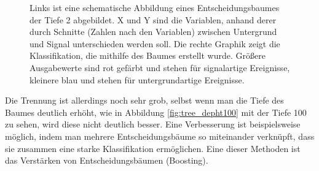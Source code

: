 \begin{figure}[tbp]
\centering     %
{}
\caption{Links ist eine schematische Abbildung eines Entscheidungsbaumes der Tiefe 2 abgebildet. X und Y sind die Variablen, anhand derer durch Schnitte (Zahlen nach den Variablen) zwischen Untergrund und Signal unterschieden werden soll. Die rechte Graphik zeigt die Klassifikation, die mithilfe des Baumes erstellt wurde. Gr\"o\ss ere Ausgabewerte sind rot gef\"arbt und stehen f\"ur signalartige Ereignisse, kleinere blau und stehen f\"ur untergrundartige Ereignisse.}
\end{figure}

Die Trennung ist allerdings noch sehr grob, selbst wenn man die Tiefe des Baumes deutlich erh\"oht, wie in Abbildung \ref{fig:tree_depht100} mit der Tiefe 100 zu sehen, wird diese nicht deutlich besser. Eine Verbesserung ist beispielsweise m\"oglich, indem man mehrere Entscheidungsb\"aume so miteinander verkn\"upft, dass sie zusammen eine starke Klassifikation erm\"oglichen. Eine dieser Methoden ist das Verst\"arken von Entscheidungsb\"aumen (Boosting).






